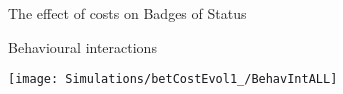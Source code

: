 \documentclass[
  ignorenonframetext,
]{beamer}
\begin{document}
\begin{frame}{The effect of costs on Badges of Status}
\protect\hypertarget{the-effect-of-costs-on-badges-of-status}{}

\begin{block}{Behavioural interactions}

\begin{center}\texttt{[image: Simulations/betCostEvol1\_/BehavIntALL]} \end{center}

\end{block}

\end{frame}
\end{document}
